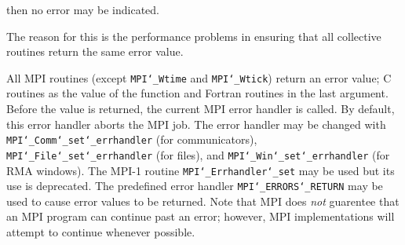 then no error may be indicated.
\par
The reason for this is the performance problems in ensuring that
all collective routines return the same error value.
\par
{}
\par
All MPI routines (except {\tt MPI{\tt \char`\_}Wtime} and {\tt MPI{\tt \char`\_}Wtick}) return an error value;
C routines as the value of the function and Fortran routines in the last
argument.  Before the value is returned, the current MPI error handler is
called.  By default, this error handler aborts the MPI job.  The error handler
may be changed with {\tt MPI{\tt \char`\_}Comm{\tt \char`\_}set{\tt \char`\_}errhandler} (for communicators),
{\tt MPI{\tt \char`\_}File{\tt \char`\_}set{\tt \char`\_}errhandler} (for files), and {\tt MPI{\tt \char`\_}Win{\tt \char`\_}set{\tt \char`\_}errhandler} (for
RMA windows).  The MPI-1 routine {\tt MPI{\tt \char`\_}Errhandler{\tt \char`\_}set} may be used but
its use is deprecated.  The predefined error handler
{\tt MPI{\tt \char`\_}ERRORS{\tt \char`\_}RETURN} may be used to cause error values to be returned.
Note that MPI does {\em not} guarentee that an MPI program can continue past
an error; however, MPI implementations will attempt to continue whenever
possible.
\par
{}
\endmanpage
